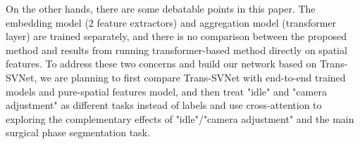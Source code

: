 \documentclass[11pt]{article} \usepackage[top=1in, bottom=1in, left=1in, right=1in]{geometry}
\begin{document}
\vspace{0.25cm}
\noindent
On the other hands, there are some debatable points in this paper. The embedding model (2 feature extractors) and aggregation model (transformer layer) are trained separately, and there is no comparison between the proposed method and results from running transformer-based method directly on spatial features. To address these two concerns and build our network based on Trans-SVNet, we are planning to first compare Trans-SVNet with end-to-end trained models and pure-spatial features model, and then treat "idle" and "camera adjustment" as different tasks instead of labels and use cross-attention to exploring the complementary effects of "idle"/"camera adjustment" and the main surgical phase segmentation task.



\end{document}
